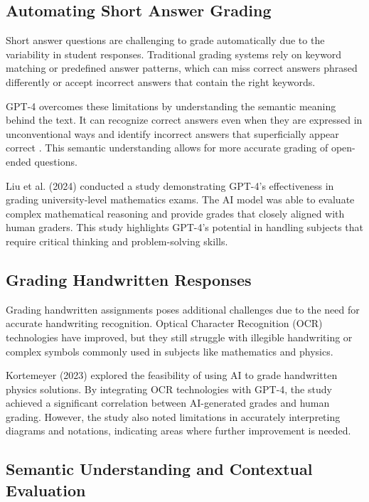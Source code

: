 \documentclass[ms,twoside,print]{nuthesis}
\begin{document}
\subsection{Automating Short Answer Grading}

Short answer questions are challenging to grade automatically due to the variability in student responses. Traditional grading systems rely on keyword matching or predefined answer patterns, which can miss correct answers phrased differently or accept incorrect answers that contain the right keywords.

GPT-4 overcomes these limitations by understanding the semantic meaning behind the text. It can recognize correct answers even when they are expressed in unconventional ways and identify incorrect answers that superficially appear correct \cite{Liu2024}. This semantic understanding allows for more accurate grading of open-ended questions.

Liu et al. (2024) \cite{Liu2024} conducted a study demonstrating GPT-4's effectiveness in grading university-level mathematics exams. The AI model was able to evaluate complex mathematical reasoning and provide grades that closely aligned with human graders. This study highlights GPT-4's potential in handling subjects that require critical thinking and problem-solving skills.

\subsection{Grading Handwritten Responses}

Grading handwritten assignments poses additional challenges due to the need for accurate handwriting recognition. Optical Character Recognition (OCR) technologies have improved, but they still struggle with illegible handwriting or complex symbols commonly used in subjects like mathematics and physics.

Kortemeyer (2023) \cite{Kortemeyer2023} explored the feasibility of using AI to grade handwritten physics solutions. By integrating OCR technologies with GPT-4, the study achieved a significant correlation between AI-generated grades and human grading. However, the study also noted limitations in accurately interpreting diagrams and notations, indicating areas where further improvement is needed.

\subsection{Semantic Understanding and Contextual Evaluation}
\end{document}
